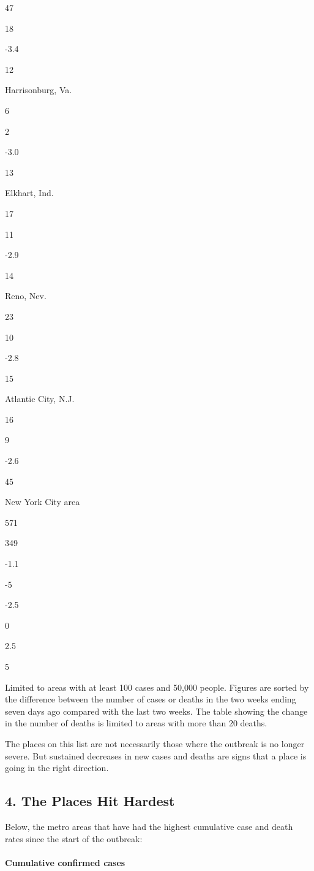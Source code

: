 47

18

-3.4

12

Harrisonburg, Va.

6

2

-3.0

13

Elkhart, Ind.

17

11

-2.9

14

Reno, Nev.

23

10

-2.8

15

Atlantic City, N.J.

16

9

-2.6

45

New York City area

571

349

-1.1

-5

-2.5

0

2.5

5

Limited to areas with at least 100 cases and 50,000 people. Figures are
sorted by the difference between the number of cases or deaths in the
two weeks ending seven days ago compared with the last two weeks. The
table showing the change in the number of deaths is limited to areas
with more than 20 deaths.

The places on this list are not necessarily those where the outbreak is
no longer severe. But sustained decreases in new cases and deaths are
signs that a place is going in the right direction.

\hypertarget{4-the-places-hit-hardest}{%
\subsection{4. The Places Hit Hardest}\label{4-the-places-hit-hardest}}

Below, the metro areas that have had the highest cumulative case and
death rates since the start of the outbreak:

\hypertarget{cumulative-confirmed-cases}{%
\paragraph{Cumulative confirmed
cases}\label{cumulative-confirmed-cases}}

